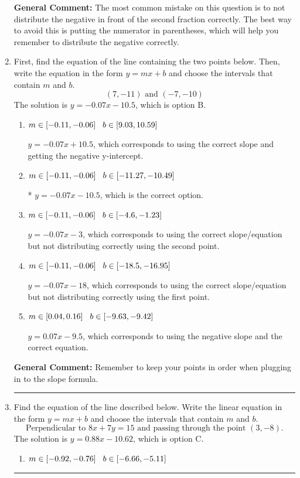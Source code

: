 \documentclass{extbook}[14pt]
\newcommand{\litem}[1]{\item #1

\rule{\textwidth}{0.4pt}}
\begin{document}
\begin{enumerate}
{\textbf{General Comment:} The most common mistake on this question is to not distribute the negative in front of the second fraction correctly. The best way to avoid this is putting the numerator in parentheses, which will help you remember to distribute the negative correctly.
}
\litem{
First, find the equation of the line containing the two points below. Then, write the equation in the form $ y=mx+b $ and choose the intervals that contain $m$ and $b$.
\[ (7, -11) \text{ and } (-7, -10) \]The solution is \( y = -0.07x -10.5 \), which is option B.\begin{enumerate}[label=\Alph*.]
\item \( m \in [-0.11, -0.06] \hspace*{3mm} b \in [9.03, 10.59] \)

 $y = -0.07x + 10.5$, which corresponds to using the correct slope and getting the negative y-intercept.
\item \( m \in [-0.11, -0.06] \hspace*{3mm} b \in [-11.27, -10.49] \)

* $y = -0.07x -10.5$, which is the correct option.
\item \( m \in [-0.11, -0.06] \hspace*{3mm} b \in [-4.6, -1.23] \)

 $y = -0.07x -3$, which corresponds to using the correct slope/equation but not distributing correctly using the second point.
\item \( m \in [-0.11, -0.06] \hspace*{3mm} b \in [-18.5, -16.95] \)

 $y = -0.07x -18$, which corresponds to using the correct slope/equation but not distributing correctly using the first point.
\item \( m \in [0.04, 0.16] \hspace*{3mm} b \in [-9.63, -9.42] \)

 $y = 0.07x -9.5$, which corresponds to using the negative slope and the correct equation.
\end{enumerate}

\textbf{General Comment:} Remember to keep your points in order when plugging in to the slope formula.
}
\litem{
Find the equation of the line described below. Write the linear equation in the form $ y=mx+b $ and choose the intervals that contain $m$ and $b$.
\[ \text{Perpendicular to } 8 x + 7 y = 15 \text{ and passing through the point } (3, -8). \]The solution is \( y = 0.88x - 10.62 \), which is option C.\begin{enumerate}[label=\Alph*.]
\item \( m \in [-0.92, -0.76] \hspace*{3mm} b \in [-6.66, -5.11] \)


\end{enumerate}}
\end{enumerate}
\end{document}
